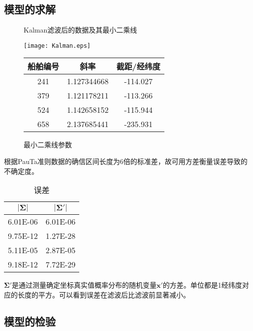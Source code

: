 \subsection{模型的求解}
\begin{figure}[htbp]
	\centering
	\begin{minipage}[htbp]{7.5cm}
		\centering
		\caption{Kalman滤波后的数据及其最小二乘线}
		\texttt{[image: Kalman.eps]}
	\end{minipage}
	\begin{minipage}[htbp]{7.5cm}
		\centering
		\caption{最小二乘线参数}
		\begin{tabular}{ccc}
			\toprule
			船舶编号	&	斜率			&	截距/经纬度		\\
			\midrule
			241		&	1.127344668	&	-114.027			\\
			379		&	1.121178211	&	-113.266			\\
			524		&	1.142658152	&	-115.944			\\
			658		&	2.137685441	&	-235.931			\\
			\bottomrule
		\end{tabular}
	\end{minipage}
\end{figure}
\par 根据PauTa准则数据的确信区间长度为6倍的标准差，故可用方差衡量误差导致的不确定度。
\begin{table}[htbp]
	\centering
	\caption{误差}
	\begin{tabular}{cc}
		\toprule
		\(|\bm{\Sigma}|\)	&	\(|\bm{\Sigma}\bm{'}|\)	\\
		\midrule
		6.01E-06			&	6.01E-06				\\
		9.75E-12			&	1.27E-28				\\
		5.11E-05			&	2.87E-05				\\
		9.18E-12			&	7.72E-29				\\
		\bottomrule
	\end{tabular}
\end{table}
\par\(\bm{\Sigma}\bm{'}\)是通过测量确定坐标真实值概率分布的随机变量\(\bm{x}\bm{'}\)的方差。单位都是1经纬度对应的长度的平方。可以看到误差在滤波后比滤波前显著减小。
\subsection{模型的检验}
